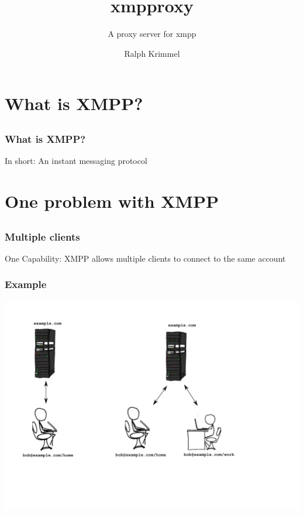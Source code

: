 \documentclass[notes=hide,yellow]{beamer}
\title{ xmpproxy}
\subtitle{A proxy server for xmpp }
\author{Ralph Krimmel}
\begin{document}
	\begin{frame}
		\titlepage 
	\end{frame}

	\section{What is XMPP?}
	\subsection*{}
	\begin{frame}
		\frametitle{What is XMPP?}
		\begin{block}{In short:}	
		An instant messaging protocol
		\end{block}
	\end{frame}

	\section{One problem with XMPP}
	\subsection*{}
	\begin{frame}
		\frametitle{Multiple clients}
		\begin{block}{One Capability:}
			XMPP allows multiple clients to connect to the same account 
		\end{block}
	\end{frame}

	\begin{frame}
		\frametitle{Example} 
		\includegraphics[scale=0.4]{../img/multiple-clients.pdf}
	\end{frame}
	
\end{document}

